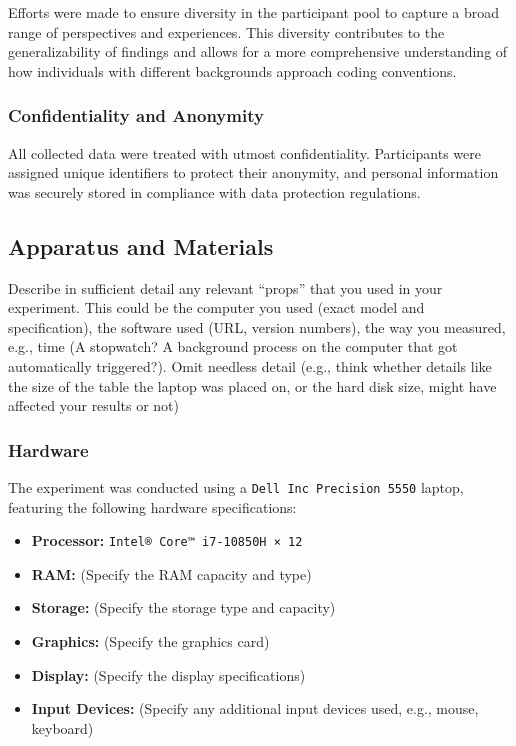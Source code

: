 \documentclass{article}
\begin{document}
Efforts were made to ensure diversity in the participant pool to capture a broad range of perspectives and experiences. This diversity contributes to the generalizability of findings and allows for a more comprehensive understanding of how individuals with different backgrounds approach coding conventions.

\subsubsection*{Confidentiality and Anonymity}

All collected data were treated with utmost confidentiality. Participants were assigned unique identifiers to protect their anonymity, and personal information was securely stored in compliance with data protection regulations.

\subsection{Apparatus and Materials}
Describe in sufficient detail any relevant “props” that you used in your experiment. This could be the computer
you used (exact model and specification), the software used (URL, version numbers), the way you measured, e.g.,
time (A stopwatch? A background process on the computer that got automatically triggered?). Omit needless
detail (e.g., think whether details like the size of the table the laptop was placed on, or the hard disk size, might
have affected your results or not)

\subsubsection*{Hardware}
The experiment was conducted using a \texttt{Dell Inc Precision 5550} laptop, featuring the following hardware specifications:
\begin{itemize}
  \item \textbf{Processor:} \texttt{Intel® Core™ i7-10850H × 12}
  \item \textbf{RAM:} (Specify the RAM capacity and type)
  \item \textbf{Storage:} (Specify the storage type and capacity)
  \item \textbf{Graphics:} (Specify the graphics card)
  \item \textbf{Display:} (Specify the display specifications)
  \item \textbf{Input Devices:} (Specify any additional input devices used, e.g., mouse, keyboard)
\end{itemize}
\end{document}
